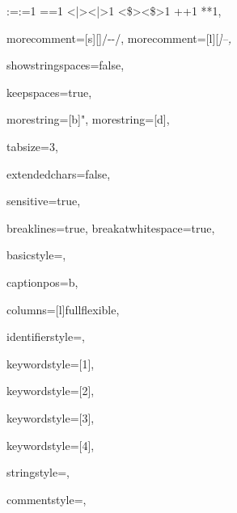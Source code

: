 {	{:=}{{\color{symbolcolor}:=}}1
	{=}{{\color{symbolcolor}=}}1
	{<|>}{{\color{symbolcolor}<|>}}1
	{<\$>}{{\color{symbolcolor}<\$>}}1
	{+}{{\color{symbolcolor}+}}1
	{*}{{\color{symbolcolor}*}}1,
	
	morecomment=[s][\color{commentcolor}]{/-}{-/},
	morecomment=[l][\itshape \color{commentcolor}]{--},
	
	showstringspaces=false,
	
	keepspaces=true,
	
	morestring=[b]",
	morestring=[d],
	
	tabsize=3,
	
	extendedchars=false,
	
	sensitive=true,
	
	breaklines=true,
	breakatwhitespace=true,
	
	basicstyle=\ttfamily\small,
	
	captionpos=b,
	
	columns=[l]fullflexible,
	
	
	identifierstyle={\ttfamily\color{black}},
	
	keywordstyle=[1]{\ttfamily\color{keywordcolor}},
	
	keywordstyle=[2]{\ttfamily\color{sortcolor}},
	
	keywordstyle=[3]{\ttfamily\color{tacticcolor}},
	
	keywordstyle=[4]{\ttfamily\color{attributecolor}},
	
	stringstyle=\ttfamily,
	
	commentstyle={\ttfamily\footnotesize },
	
}
